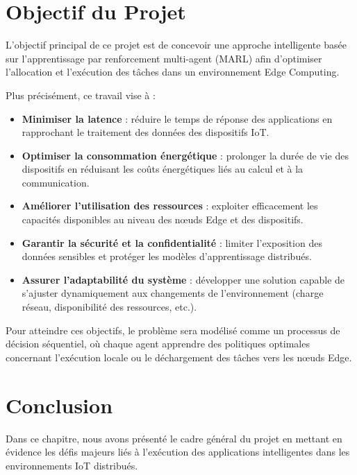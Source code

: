 \documentclass[12pt,a4paper]{report}
\begin{document}
\section{Objectif du Projet}

L’objectif principal de ce projet est de concevoir une approche intelligente basée sur l’apprentissage par renforcement multi-agent (MARL) afin d’optimiser l’allocation et l’exécution des tâches dans un environnement Edge Computing.

Plus précisément, ce travail vise à :

\begin{itemize}
    \item \textbf{Minimiser la latence} : réduire le temps de réponse des applications en rapprochant le traitement des données des dispositifs IoT.
    
    \item \textbf{Optimiser la consommation énergétique} : prolonger la durée de vie des dispositifs en réduisant les coûts énergétiques liés au calcul et à la communication.
    
    \item \textbf{Améliorer l’utilisation des ressources} : exploiter efficacement les capacités disponibles au niveau des nœuds Edge et des dispositifs.
    
    \item \textbf{Garantir la sécurité et la confidentialité} : limiter l’exposition des données sensibles et protéger les modèles d’apprentissage distribués.
    
    \item \textbf{Assurer l’adaptabilité du système} : développer une solution capable de s’ajuster dynamiquement aux changements de l’environnement (charge réseau, disponibilité des ressources, etc.).
\end{itemize}

Pour atteindre ces objectifs, le problème sera modélisé comme un processus de décision séquentiel, où chaque agent apprendre des politiques optimales concernant l’exécution locale ou le déchargement des tâches vers les nœuds Edge.


\section{Conclusion}

Dans ce chapitre, nous avons présenté le cadre général du projet en mettant en évidence les défis majeurs liés à l’exécution des applications intelligentes dans les environnements IoT distribués.
\end{document}
